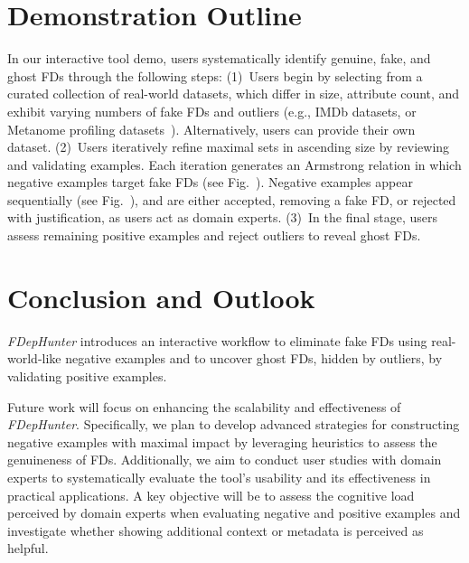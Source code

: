 \section{Demonstration Outline}
In our interactive tool demo, users systematically identify genuine, fake, and ghost FDs through the following steps:
(1)~Users begin by selecting from a curated collection of real-world datasets, which differ in size, attribute count, and exhibit varying numbers of fake FDs and outliers (e.g., IMDb datasets, or Metanome profiling datasets~\citep{hpi_fds}).
Alternatively, users can provide their own dataset. 
%
(2)~Users iteratively refine maximal sets in ascending size by reviewing and validating examples. Each iteration generates an Armstrong relation in which negative examples target fake FDs (see Fig.~). Negative examples appear sequentially (see Fig.~), and are either accepted, removing a fake FD, or rejected with justification, as users act as domain experts. %
%
(3)~In the final stage, users assess remaining positive examples and reject outliers to reveal ghost FDs.%


\section{Conclusion and Outlook}
\emph{FDepHunter} introduces 
an interactive workflow to eliminate fake FDs using real-world-like negative examples and to uncover ghost FDs, hidden by outliers, by validating positive examples.

Future work will focus on enhancing the scalability and effectiveness of \emph{FDepHunter}. Specifically, we plan to develop advanced strategies for constructing negative examples with maximal impact by leveraging heuristics to assess the genuineness of FDs. %
Additionally, we aim to conduct user studies with domain experts 
to systematically evaluate the tool's usability and its effectiveness in practical applications. A key objective will be to assess the cognitive load perceived by domain experts when evaluating negative and positive examples and investigate whether showing additional context or metadata is perceived as helpful.

